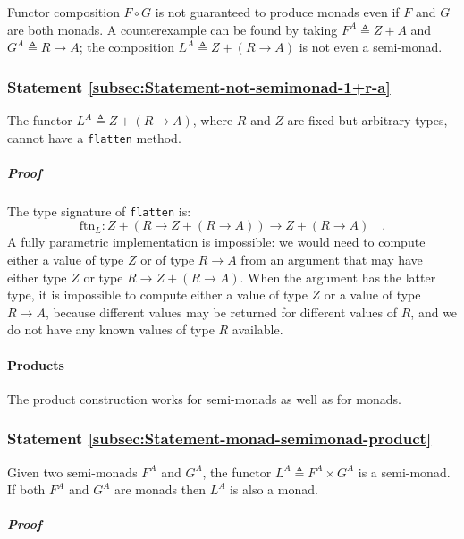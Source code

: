 Functor composition $F\circ G$ is not guaranteed to produce monads
even if $F$ and $G$ are both monads. A counterexample can be found
by taking $F^{A}\triangleq Z+A$ and $G^{A}\triangleq R\rightarrow A$;
the composition $L^{A}\triangleq Z+\left(R\rightarrow A\right)$ is
not even a semi-monad.

\subsubsection{Statement \label{subsec:Statement-not-semimonad-1+r-a}\ref{subsec:Statement-not-semimonad-1+r-a}}

The functor $L^{A}\triangleq Z+\left(R\rightarrow A\right)$, where
$R$ and $Z$ are fixed but arbitrary types, cannot have a \lstinline!flatten!
method.

\subparagraph{Proof}

The type signature of \lstinline!flatten! is:
\[
\text{ftn}_{L}:Z+\left(R\rightarrow Z+\left(R\rightarrow A\right)\right)\rightarrow Z+\left(R\rightarrow A\right)\quad.
\]
A fully parametric implementation is impossible: we would need to
compute either a value of type $Z$ or of type $R\rightarrow A$ from
an argument that may have either type $Z$ or type $R\rightarrow Z+\left(R\rightarrow A\right)$.
When the argument has the latter type, it is impossible to compute
either a value of type $Z$ or a value of type $R\rightarrow A$,
because different values may be returned for different values of $R$,
and we do not have any known values of type $R$ available. 

\paragraph{Products}

The product construction works for semi-monads as well as for monads.

\subsubsection{Statement \label{subsec:Statement-monad-semimonad-product}\ref{subsec:Statement-monad-semimonad-product}}

Given two semi-monads $F^{A}$ and $G^{A}$, the functor $L^{A}\triangleq F^{A}\times G^{A}$
is a semi-monad. If both $F^{A}$ and $G^{A}$ are monads then $L^{A}$
is also a monad.

\subparagraph{Proof}

